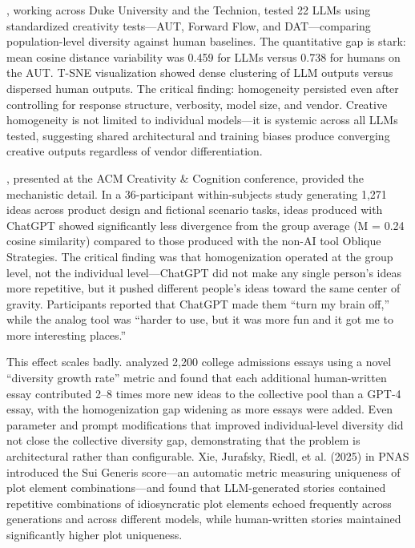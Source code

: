 \documentclass[12pt,a4paper]{article}
\begin{document}
\citet{wenger2025}, working across Duke University and the Technion, tested 22 LLMs using standardized creativity tests---AUT, Forward Flow, and DAT---comparing population-level diversity against human baselines. The quantitative gap is stark: mean cosine distance variability was 0.459 for LLMs versus 0.738 for humans on the AUT. T-SNE visualization showed dense clustering of LLM outputs versus dispersed human outputs. The critical finding: homogeneity persisted even after controlling for response structure, verbosity, model size, and vendor. Creative homogeneity is not limited to individual models---it is systemic across all LLMs tested, suggesting shared architectural and training biases produce converging creative outputs regardless of vendor differentiation.

\citet{anderson2024}, presented at the ACM Creativity \& Cognition conference, provided the mechanistic detail. In a 36-participant within-subjects study generating 1,271 ideas across product design and fictional scenario tasks, ideas produced with ChatGPT showed significantly less divergence from the group average (M = 0.24 cosine similarity) compared to those produced with the non-AI tool Oblique Strategies. The critical finding was that homogenization operated at the group level, not the individual level---ChatGPT did not make any single person's ideas more repetitive, but it pushed different people's ideas toward the same center of gravity. Participants reported that ChatGPT made them ``turn my brain off,'' while the analog tool was ``harder to use, but it was more fun and it got me to more interesting places.''

This effect scales badly. \citet{moon2025} analyzed 2,200 college admissions essays using a novel ``diversity growth rate'' metric and found that each additional human-written essay contributed 2--8 times more new ideas to the collective pool than a GPT-4 essay, with the homogenization gap widening as more essays were added. Even parameter and prompt modifications that improved individual-level diversity did not close the collective diversity gap, demonstrating that the problem is architectural rather than configurable. Xie, Jurafsky, Riedl, et al. (2025) in PNAS introduced the Sui Generis score---an automatic metric measuring uniqueness of plot element combinations---and found that LLM-generated stories contained repetitive combinations of idiosyncratic plot elements echoed frequently across generations and across different models, while human-written stories maintained significantly higher plot uniqueness.
\end{document}
